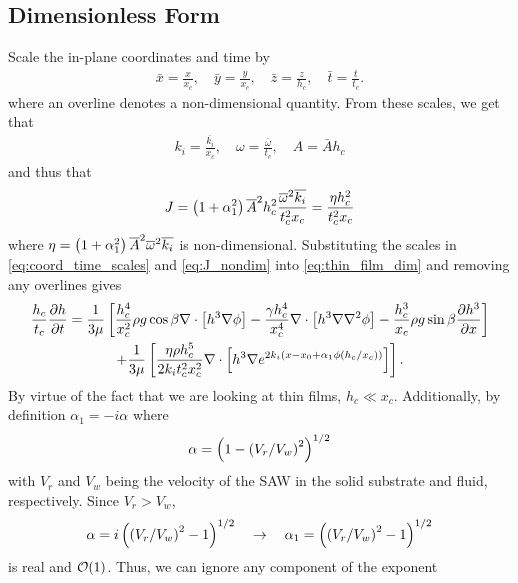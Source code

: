 \subsection{Dimensionless Form}
Scale the in-plane coordinates and time by 
\begin{gather}
    \bar{x} = \frac{x}{x_c}, \quad \bar{y} = \frac{y}{x_c}, \quad \bar{z} = \frac{z}{h_c}, \quad \bar{t} = \frac{t}{t_c}. 
    \label{eq:coord_time_scales}
\end{gather}
where an overline denotes a non-dimensional quantity. From these scales, we get that  
\begin{gather*}
    k_i = \frac{\bar{k_i}}{x_c}, \quad \omega = \frac{\bar{\omega}}{t_c}, \quad A = \bar{A}h_c
\end{gather*}
and thus that 
\begin{align}
    J = \left( 1 + \alpha_1^2 \right)  \overline{A}^2 h_c^2 \frac{\overline{\omega}^2 \overline{k_i}}{t_c^2 x_c} = \frac{\eta h_c^2}{t_c^2 x_c}
    \label{eq:J_nondim}
\end{align}
where $\eta = \left( 1 + \alpha_1^2 \right)  \overline{A}^2 \overline{\omega}^2 \overline{k_i}$ is non-dimensional. Substituting the scales in 
\cref{eq:coord_time_scales} and \cref{eq:J_nondim} into \cref{eq:thin_film_dim} and removing any overlines gives 
\begin{multline}
    \frac{h_c}{t_c} \frac{\partial h}{\partial t} = \frac{1}{3\mu} \left[ 
        \frac{h_c^4}{x_c^2} \rho g \cos \beta \nabla \cdot \left[ h^3\nabla\phi \right] - 
        \frac{\gamma h_c^4}{x_c^4} \nabla \cdot \left[ h^3 \nabla \nabla^2 \phi \right] - 
        \frac{h_c^3}{x_c} \rho g \sin\beta \frac{\partial h^3}{\partial x}
     \right]\\
    + \frac{1}{3\mu} \left[  
        \frac{\eta \rho h_c^5}{2k_i t_c^2 x_c^2} \nabla \cdot \left[ h^3 \nabla e^{2k_i \left( x - x_0 + \alpha_1 \phi \left( h_c/x_c \right) \right)} \right]
     \right].
    \label{eq:nondim_first}
\end{multline}
By virtue of the fact that we are looking at thin films, $h_c \ll x_c$. Additionally, by definition
$\alpha_1 = -i \alpha$ where 
\begin{equation*}
    \alpha = \left( 1 - \left( V_r/V_w \right)^2 \right)^{1/2}
\end{equation*}
with $V_r$ and $V_w$ being the velocity of the SAW in the solid substrate and fluid, respectively. Since 
$V_r > V_w$, 
\begin{equation*}
    \alpha = i \left( \left( V_r/V_w \right)^2 - 1 \right)^{1/2} \quad \rightarrow \quad \alpha_1 = \left( \left( V_r/V_w \right)^2 - 1 \right)^{1/2}
\end{equation*}
is real and $\operatorname{\mathcal{O}}\!\left(1\right)$. Thus, we can ignore any component of the exponent 
